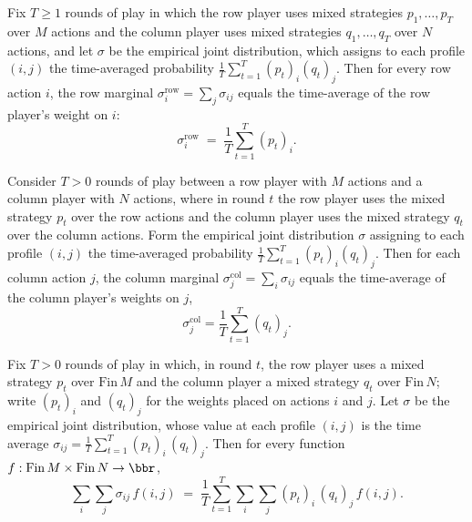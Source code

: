 \begin{lemma}
\label{empiricalJoint_rowMarginal}
\leanok
{}
Fix $T \ge 1$ rounds of play in which the row player uses mixed strategies
$p_1,\dots,p_T$ over $M$ actions and the column player uses mixed strategies
$q_1,\dots,q_T$ over $N$ actions, and let $\sigma$ be the empirical joint distribution,
which assigns to each profile $(i,j)$ the time-averaged probability
$\frac{1}{T}\sum_{t=1}^{T} (p_t)_i (q_t)_j$. Then for every row action $i$, the row
marginal $\sigma^{\mathrm{row}}_i = \sum_{j} \sigma_{ij}$ equals the time-average of the
row player's weight on $i$:
\[
\sigma^{\mathrm{row}}_i \;=\; \frac{1}{T}\sum_{t=1}^{T} (p_t)_i .
\]
\end{lemma}

\begin{lemma}
\label{empiricalJoint_colMarginal}
\leanok
{}
Consider $T > 0$ rounds of play between a row player with $M$ actions and a column
player with $N$ actions, where in round $t$ the row player uses the mixed strategy $p_t$
over the row actions and the column player uses the mixed strategy $q_t$ over the column
actions. Form the empirical joint distribution $\sigma$ assigning to each profile
$(i,j)$ the time-averaged probability $\frac{1}{T}\sum_{t=1}^{T} (p_t)_i (q_t)_j$. Then
for each column action $j$, the column marginal $\sigma^{\mathrm{col}}_j = \sum_i
\sigma_{ij}$ equals the time-average of the column player's weights on $j$,
\[
\sigma^{\mathrm{col}}_j = \frac{1}{T}\sum_{t=1}^{T} (q_t)_j.
\]
\end{lemma}

\begin{lemma}
\label{empiricalJoint_sum_prob_mul}
\leanok
{}
Fix $T > 0$ rounds of play in which, in round $t$, the row player uses a mixed strategy
$p_t$ over $\mathrm{Fin}\,M$ and the column player a mixed strategy $q_t$ over
$\mathrm{Fin}\,N$; write $(p_t)_i$ and $(q_t)_j$ for the weights placed on actions $i$
and $j$. Let $\sigma$ be the empirical joint distribution, whose value at each profile
$(i,j)$ is the time average $\sigma_{ij} = \frac{1}{T}\sum_{t=1}^{T} (p_t)_i\,(q_t)_j$.
Then for every function $f : \mathrm{Fin}\,M \times \mathrm{Fin}\,N \to \bbr$,
\[
\sum_{i}\sum_{j} \sigma_{ij}\, f(i,j) \;=\; \frac{1}{T}\sum_{t=1}^{T}\sum_{i}\sum_{j}
(p_t)_i\,(q_t)_j\, f(i,j).
\]
\end{lemma}

